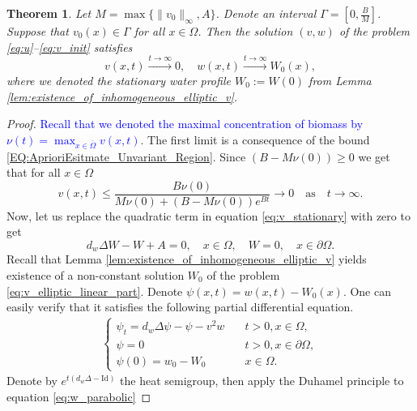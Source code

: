 \documentclass[11pt, a4paper]{article}
\theoremstyle{break}
\newtheorem{thm}{Theorem}[section]
\theoremstyle{break}
\theoremstyle{break}
\theoremstyle{break}
\theoremstyle{break}
\theoremstyle{break}
\theoremstyle{break}
\theoremstyle{break}
\theoremstyle{break}
\theoremstyle{break}
\begin{document}
\begin{thm}
    \label{thm:Exinction-Of-Vegetation}
    Let $M = \max\{\|v_0\|_\infty, A\}$. Denote an interval $\Gamma  = \left[0, \frac{B}{M}\right]$. Suppose that $v_0(x) \in \Gamma$ for all $x \in \Omega$. Then the solution $(v, w)$ of the problem \eqref{eq:u}--\eqref{eq:v_init} satisfies
    \begin{equation}
        v(x,t) \xrightarrow{t \rightarrow \infty} 0, \quad w(x,t) \xrightarrow{t \rightarrow \infty} W_0(x),
    \end{equation}
    where we denoted the stationary water profile $W_0 := W(0)$ from Lemma \ref{lem:existence_of_inhomogeneous_elliptic_v}.
\end{thm}
\begin{proof}
    \textcolor{blue}{Recall that we denoted the maximal concentration of biomass by $\displaystyle \nu(t) = \max_{x \in \overline{\Omega}} v(x,t)$}. The first limit is a consequence of the bound \eqref{EQ:AprioriEsitmate_Unvariant_Region}. Since $(B - M\nu(0)) \geq 0$ we get that for all $x \in \Omega$
    \begin{equation*}
        v(x,t) \leq \frac{B\nu(0)}{M \nu(0) + 
        (B - M \nu(0)) e^{B t}} \rightarrow 0 \quad \text{as} \quad t \rightarrow \infty.
    \end{equation*}
    Now, let us replace the quadratic term in equation \eqref{eq:v_stationary} with zero to get
    \begin{equation}
        \label{eq:v_elliptic_linear_part}
        d_w \Delta W - W + A = 0, \quad x \in \Omega, \quad W = 0, \quad x \in \partial \Omega.
    \end{equation}
    Recall that Lemma \ref{lem:existence_of_inhomogeneous_elliptic_v} yields existence of a non-constant solution $W_0$ of the problem \eqref{eq:v_elliptic_linear_part}. Denote $\psi(x,t) = w(x,t) - W_0(x)$. One can easily verify that it satisfies the following partial differential equation.
    \begin{align}
        \label{eq:w_parabolic}
        \begin{cases}
            \psi_t = d_w\Delta \psi - \psi - v^2w &\quad t > 0, x \in \Omega, \\
            \psi = 0 &\quad t > 0, x \in \partial\Omega, \\
            \psi(0) = w_0 - W_0 &\quad x \in \Omega.
        \end{cases}
    \end{align}
    Denote by $e^{t(d_w\Delta - \mathrm{Id})}$ the heat semigroup, then apply the Duhamel principle to equation \eqref{eq:w_parabolic}

\end{proof}
\end{document}
